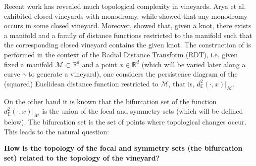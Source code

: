 \documentclass[a4paper,english,numberwithinsect]{eurocg26-submission}
\newcommand{\M}{\mathcal{M}}
\begin{document}
Recent work has revealed much topological complexity in vineyards. Arya et al. \cite{Arya2024} exhibited closed vineyards with monodromy, while \cite{chambers2025braidingvineyards} showed that any monodromy occurs in some closed vineyard. Moreover, \cite{chambers2025braidingvineyards} showed that, given a knot, there exists a manifold and a family of distance functions restricted to the manifold such that the corresponding closed vineyard contains the given knot. { The construction of \cite{chambers2025braidingvineyards} is performed in the context of the Radial Distance Transform (RDT), i.e. given fixed a manifold $\M\subset \mathbb{R}^d$ and a point $x \in \mathbb{R}^d$ (which will be varied later along a curve $\gamma$ to generate a vineyard), one considers the persistence diagram of the (squared) Euclidean distance function restricted to $\M$, that is, $d_\mathbb{E}^2  (\cdot , x) |_{\M}$.  } 




{On the other hand it is known \cite{Bruce1985symmetry,porteous1971normal} that the bifurcation set of the function $d_\mathbb{E}^2  (\cdot , x) |_{\M}$ is the union of the focal and symmetry sets (which will be defined below). The bifurcation set is the set of points where topological changes occur. This leads to the natural question: 

\textbf{How is the topology of the focal and symmetry sets (the bifurcation set) related to the topology of the vineyard? }
} 


\end{document}
